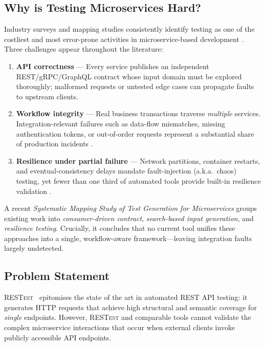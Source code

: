 \documentclass[conference]{IEEEtran}
\begin{document}
\subsection*{Why is Testing Microservices Hard?}
Industry surveys and mapping studies consistently identify testing as
one of the costliest and most error-prone activities in
microservice-based development
\cite{waseem2020testing,miao2025sms}.  
Three challenges appear throughout the literature:

\begin{enumerate}[leftmargin=*,label=\roman*)]
  \item \textbf{API correctness} — Every service publishes an
        independent REST/gRPC/GraphQL contract whose input domain must be
        explored thoroughly; malformed requests or untested edge cases
        can propagate faults to upstream clients.
  \item \textbf{Workflow integrity} — Real business transactions
        traverse \emph{multiple} services.  
        Integration-relevant failures such as data-flow mismatches,
        missing authentication tokens, or out-of-order requests
        represent a substantial share of production incidents
        \cite{zhou2018microservice}.
  \item \textbf{Resilience under partial failure} — Network partitions,
        container restarts, and eventual-consistency delays mandate
        fault-injection (a.k.a.\ chaos) testing, yet fewer than one
        third of automated tools provide built-in resilience validation
        \cite{waseem2020testing}.
\end{enumerate}

A recent \emph{Systematic Mapping Study of Test Generation for
Microservices} \cite{miao2025sms} groups existing work into
\textit{consumer-driven contract}, \textit{search-based input
generation}, and \textit{resilience testing}.  Crucially, it concludes
that no current tool unifies these approaches into a single,
workflow-aware framework—leaving integration faults largely
undetected.

\subsection*{Problem Statement}
\textsc{RESTest}~\cite{martin2019restest} epitomises the state of the
art in automated REST API testing: it generates HTTP requests that
achieve high structural and semantic coverage for \emph{single}
endpoints.  However, \textsc{RESTest} and comparable tools cannot
validate the complex microservice interactions that occur when external clients invoke publicly accessible API endpoints.
\end{document}
